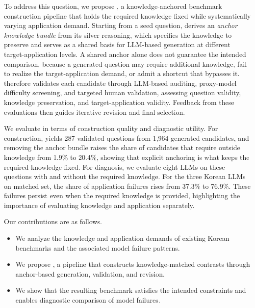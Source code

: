 To address this question, we propose \name, a knowledge-anchored benchmark construction pipeline that holds the required knowledge fixed while systematically varying application demand.
Starting from a seed question, \name derives an \textit{anchor knowledge bundle} from its silver reasoning, which specifies the knowledge to preserve and serves as a shared basis for LLM-based generation at different target-application levels.
A shared anchor alone does not guarantee the intended comparison, because a generated question may require additional knowledge, fail to realize the target-application demand, or admit a shortcut that bypasses it.
\name therefore validates each candidate through LLM-based auditing, proxy-model difficulty screening, and targeted human validation, assessing question validity, knowledge preservation, and target-application validity. 
Feedback from these evaluations then guides iterative revision and final selection.

We evaluate \name{} in terms of construction quality and diagnostic utility.
For construction, \name{} yields 287 validated questions from 1,964 generated candidates, and removing the anchor bundle raises the share of candidates that require outside knowledge from 1.9\% to 20.4\%, showing that explicit anchoring is what keeps the required knowledge fixed.
For diagnosis, we evaluate eight LLMs on these questions with and without the required knowledge. For the three Korean LLMs on matched set, the share of application failures rises from 37.3\% to 76.9\%.
These failures persist even when the required knowledge is provided, highlighting the importance of evaluating knowledge and application separately.

Our contributions are as follows.
\begin{itemize}[leftmargin=3.5mm, topsep=2pt, itemsep=2pt, parsep=0pt]
    \item[$\circ$] We analyze the knowledge and application demands of existing Korean benchmarks and the associated model failure patterns.

    \item[$\circ$] We propose \name{}, a pipeline that constructs knowledge-matched contrasts through anchor-based generation, validation, and revision.
    
    \item[$\circ$] We show that the resulting benchmark satisfies the intended constraints and enables diagnostic comparison of model failures.
\end{itemize}